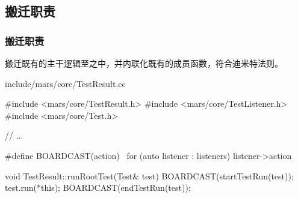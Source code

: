\begin{content}
\subsection{搬迁职责}

\subsubsection{搬迁职责}

搬迁既有的主干逻辑至之中，并内联化既有的成员函数，符合迪米特法则。

\begin{nodiff}{include/mars/core/TestResult.cc}
 \begin{c++}
#include <mars/core/TestResult.h>
#include <mars/core/TestListener.h>
#include <mars/core/Test.h>

// ...

#define BOARDCAST(action) \
  for (auto listener : listeners) listener->action

void TestResult::runRootTest(Test& test) {
  BOARDCAST(startTestRun(test));
  test.run(*this);
  BOARDCAST(endTestRun(test));
}
 \end{c++}
\end{nodiff}

\end{content}

